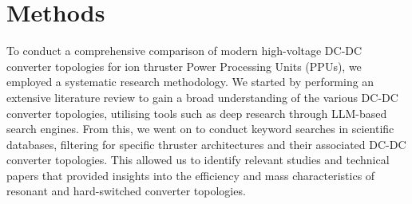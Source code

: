 \section{Methods}
To conduct a comprehensive comparison of modern high-voltage DC-DC converter topologies for ion thruster Power Processing Units (PPUs), we employed a systematic research methodology. We started by performing an extensive literature review to gain a broad understanding of the various DC-DC converter topologies, utilising tools such as deep research through LLM-based search engines. From this, we went on to conduct keyword searches in scientific databases, filtering for specific thruster architectures and their associated DC-DC converter topologies. This allowed us to identify relevant studies and technical papers that provided insights into the efficiency and mass characteristics of resonant and hard-switched converter topologies.
